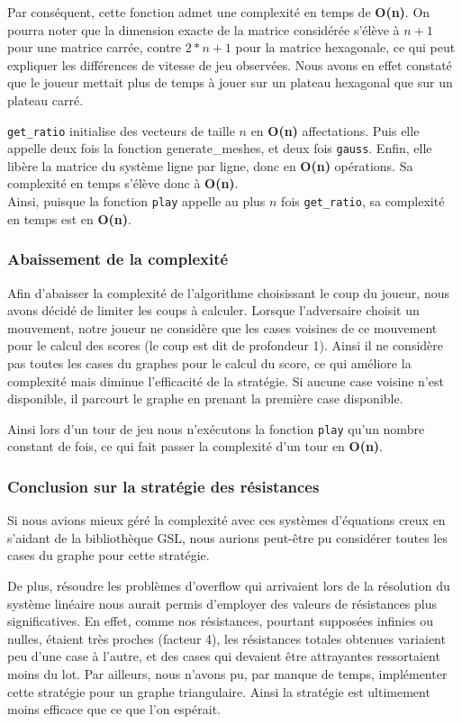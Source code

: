 \documentclass{article}
\begin{document}
 Par conséquent, cette fonction admet une complexité en temps de \textbf{O(n)}. On pourra noter que la dimension exacte de la matrice considérée s'élève à $n+1$ pour une matrice carrée, contre $2*n + 1$ pour la matrice hexagonale, ce qui peut expliquer les différences de vitesse de jeu observées. Nous avons en effet constaté que le joueur mettait plus de temps à jouer sur un plateau hexagonal que sur un plateau carré.

\lstinline{get_ratio} initialise des vecteurs de taille $n$ en \textbf{O(n)} affectations. Puis elle appelle deux fois la fonction generate\_meshes, et deux fois \lstinline{gauss}. Enfin, elle libère la matrice du système ligne par ligne, donc en \textbf{O(n)} opérations. Sa complexité en temps s'élève donc à \textbf{O(n)}.\ \\

Ainsi, puisque la fonction \lstinline{play} appelle au plus $n$ fois \lstinline{get_ratio}, sa complexité en temps est en \textbf{O(n)}.

\subsubsection{Abaissement de la complexité}
Afin d'abaisser la complexité de l'algorithme choisissant le coup du joueur, nous avons décidé de limiter les coups à calculer. Lorsque l'adversaire choisit un mouvement, notre joueur ne considère que les cases voisines de ce mouvement pour le calcul des scores (le coup est dit de profondeur 1). Ainsi il ne considère pas toutes les cases du graphes pour le calcul du score, ce qui améliore la complexité mais diminue l'efficacité de la stratégie. Si aucune case voisine n'est disponible, il parcourt le graphe en prenant la première case disponible.

Ainsi lors d'un tour de jeu nous n'exécutons la fonction \lstinline{play} qu'un nombre constant de fois, ce qui fait passer la complexité d'un tour en \textbf{O(n)}.

\subsubsection{Conclusion sur la stratégie des résistances}
Si nous avions mieux géré la complexité avec ces systèmes d'équations creux en s'aidant de la bibliothèque GSL, nous aurions peut-être pu considérer toutes les cases du graphe pour cette stratégie. 

De plus, résoudre les problèmes d'overflow qui arrivaient lors de la résolution du système linéaire nous aurait permis d'employer des valeurs de résistances plus significatives. En effet, comme nos résistances, pourtant supposées infinies ou nulles, étaient très proches (facteur 4), les résistances totales obtenues variaient peu d'une case à l'autre, et des cases qui devaient être attrayantes ressortaient moins du lot. 
Par ailleurs, nous n'avons pu, par manque de temps, implémenter cette stratégie pour un graphe triangulaire. Ainsi la stratégie est ultimement moins efficace que ce que l'on espérait.
\end{document}
